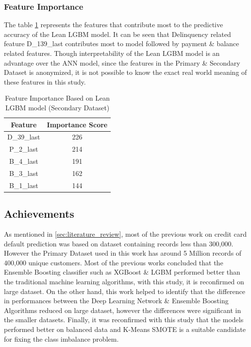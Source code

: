 \documentclass[twoside,11pt,a4paper]{article}
\begin{document}
\subsubsection{Feature Importance} \label{subsec:feature_imp}
The table \ref{table:imp_features} represents the features that contribute most to the predictive accuracy of the Lean \acs{LGBM} model. It can be seen that Delinquency related feature D\_139\_last contributes most to model followed by payment \& balance related features. Though interpretability  of the Lean \acs{LGBM} model is an advantage over the \acs{ANN} model, since the features in the Primary \& Secondary Dataset is anonymized, it is not possible to know the exact real world meaning of these features in this study. \\

\begin{table}[h]
	\begin{center}
		\begin{tabular}{|| c | c ||} 
			\hline
			Feature & Importance Score \\ [0.5ex] 
			\hline\hline
			D\_39\_last &	226 \\
			\hline
			P\_2\_last &	214 \\
			\hline
			B\_4\_last &	191 \\
			\hline
			B\_3\_last &	162 \\
			\hline
			B\_1\_last &	144 \\
			\hline
		\end{tabular}
		\caption{Feature Importance Based on Lean \acs{LGBM} model  (Secondary Dataset)}
		\label{table:imp_features}
	\end{center}
\end{table}


\subsection{Achievements}
As mentioned in \ref{sec:literature_review}, most of the previous work on credit card default prediction was based on dataset containing records less than 300,000. However the Primary Dataset used in this work has around 5 Million records of 400,000 unique customers. Most of the previous works concluded that the Ensemble Boosting classifier such as \acs{XGBoost} \& \acs{LGBM} performed better than the traditional machine learning algorithms, with this study, it is reconfirmed on large dataset. On the other hand, this work helped to identify  that the difference in performances between the Deep Learning Network \& Ensemble Boosting Algorithms reduced on large dataset, however the differences were significant in the smaller datasets. Finally, it was reconfirmed with this study that the models performed better on balanced data and  K-Means \acs{SMOTE} is a suitable candidate for fixing the class imbalance problem. 
\end{document}
